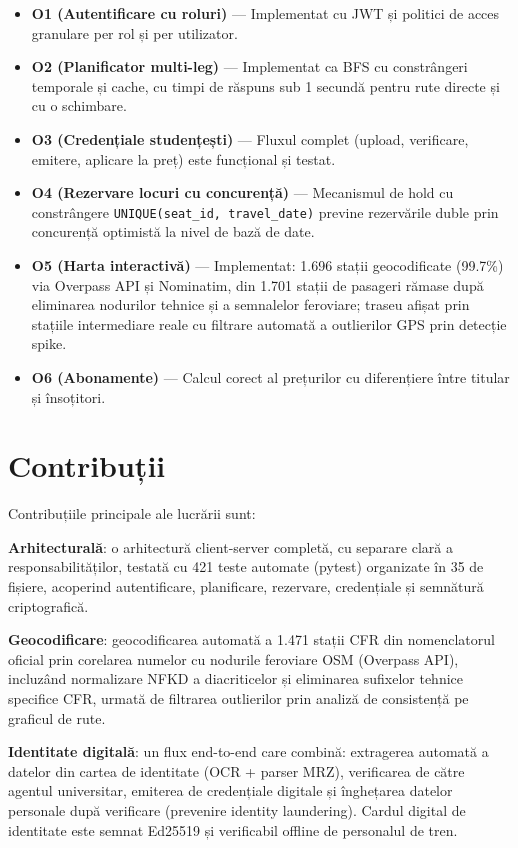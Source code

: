\documentclass[12pt,a4paper]{report}
\begin{document}
\begin{itemize}
  \item \textbf{O1 (Autentificare cu roluri)} — Implementat cu JWT și politici de acces granulare per rol și per utilizator.
  \item \textbf{O2 (Planificator multi-leg)} — Implementat ca BFS cu constrângeri temporale și cache, cu timpi de răspuns sub 1 secundă pentru rute directe și cu o schimbare.
  \item \textbf{O3 (Credențiale studențești)} — Fluxul complet (upload, verificare, emitere, aplicare la preț) este funcțional și testat.
  \item \textbf{O4 (Rezervare locuri cu concurență)} — Mecanismul de hold cu constrângere \texttt{UNIQUE(seat\_id, travel\_date)} previne rezervările duble prin concurență optimistă la nivel de bază de date.
  \item \textbf{O5 (Harta interactivă)} — Implementat: 1.696 stații geocodificate (99.7\%) via Overpass API și Nominatim, din 1.701 stații de pasageri rămase după eliminarea nodurilor tehnice și a semnalelor feroviare; traseu afișat prin stațiile intermediare reale cu filtrare automată a outlierilor GPS prin detecție spike.
  \item \textbf{O6 (Abonamente)} — Calcul corect al prețurilor cu diferențiere între titular și însoțitori.
\end{itemize}

\section{Contribuții}

Contribuțiile principale ale lucrării sunt:

\textbf{Arhitecturală}: o arhitectură client-server completă, cu separare clară a responsabilităților, testată cu 421 teste automate (pytest) organizate în 35 de fișiere, acoperind autentificare, planificare, rezervare, credențiale și semnătură criptografică.

\textbf{Geocodificare}: geocodificarea automată a 1.471 stații CFR din nomenclatorul oficial prin corelarea numelor cu nodurile feroviare OSM (Overpass API), incluzând normalizare NFKD a diacriticelor și eliminarea sufixelor tehnice specifice CFR, urmată de filtrarea outlierilor prin analiză de consistență pe graficul de rute.

\textbf{Identitate digitală}: un flux end-to-end care combină: extragerea automată a datelor din cartea de identitate (OCR + parser MRZ), verificarea de către agentul universitar, emiterea de credențiale digitale și înghețarea datelor personale după verificare (prevenire identity laundering). Cardul digital de identitate este semnat Ed25519 și verificabil offline de personalul de tren.
\end{document}
